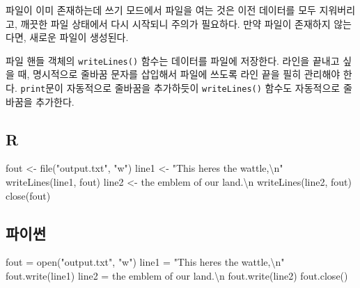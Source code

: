 \documentclass[
  letterpaper,
]{book}
\newenvironment{Shaded}{\begin{snugshade}}{\end{snugshade}}
\newcommand{\BuiltInTok}[1]{\textcolor[rgb]{0.00,0.23,0.31}{#1}}
\newcommand{\CharTok}[1]{\textcolor[rgb]{0.13,0.47,0.30}{#1}}
\newcommand{\FunctionTok}[1]{\textcolor[rgb]{0.28,0.35,0.67}{#1}}
\newcommand{\NormalTok}[1]{\textcolor[rgb]{0.00,0.23,0.31}{#1}}
\newcommand{\OperatorTok}[1]{\textcolor[rgb]{0.37,0.37,0.37}{#1}}
\newcommand{\OtherTok}[1]{\textcolor[rgb]{0.00,0.23,0.31}{#1}}
\newcommand{\SpecialCharTok}[1]{\textcolor[rgb]{0.37,0.37,0.37}{#1}}
\newcommand{\StringTok}[1]{\textcolor[rgb]{0.13,0.47,0.30}{#1}}
\begin{document}
파일이 이미 존재하는데 쓰기 모드에서 파일을 여는 것은 이전 데이터를 모두
지워버리고, 깨끗한 파일 상태에서 다시 시작되니 주의가 필요하다. 만약
파일이 존재하지 않는다면, 새로운 파일이 생성된다.

파일 핸들 객체의 \texttt{writeLines()} 함수는 데이터를 파일에 저장한다.
라인을 끝내고 싶을 때, 명시적으로 줄바꿈 문자를 삽입해서 파일에 쓰도록
라인 끝을 필히 관리해야 한다. \texttt{print}문이 자동적으로 줄바꿈을
추가하듯이 \texttt{writeLines()} 함수도 자동적으로 줄바꿈을 추가한다.

\subsection*{R}\label{r-40}

\begin{Shaded}
\begin{Highlighting}[]
\NormalTok{fout }\OtherTok{\textless{}{-}} \FunctionTok{file}\NormalTok{(}\StringTok{"output.txt"}\NormalTok{, }\StringTok{"w"}\NormalTok{)}
\NormalTok{line1 }\OtherTok{\textless{}{-}} \StringTok{"This here\textquotesingle{}s the wattle,}\SpecialCharTok{\textbackslash{}n}\StringTok{"}
\FunctionTok{writeLines}\NormalTok{(line1, fout)}
\NormalTok{line2 }\OtherTok{\textless{}{-}} \StringTok{\textquotesingle{}the emblem of our land.}\SpecialCharTok{\textbackslash{}n}\StringTok{\textquotesingle{}}
\FunctionTok{writeLines}\NormalTok{(line2, fout)}
\FunctionTok{close}\NormalTok{(fout)}
\end{Highlighting}
\end{Shaded}

\subsection*{파이썬}\label{uxd30cuxc774uxc36c-40}

\begin{Shaded}
\begin{Highlighting}[]
\NormalTok{fout }\OperatorTok{=} \BuiltInTok{open}\NormalTok{(}\StringTok{"output.txt"}\NormalTok{, }\StringTok{"w"}\NormalTok{)}
\NormalTok{line1 }\OperatorTok{=} \StringTok{"This here\textquotesingle{}s the wattle,}\CharTok{\textbackslash{}n}\StringTok{"}
\NormalTok{fout.write(line1)}
\NormalTok{line2 }\OperatorTok{=} \StringTok{\textquotesingle{}the emblem of our land.}\CharTok{\textbackslash{}n}\StringTok{\textquotesingle{}}
\NormalTok{fout.write(line2)}
\NormalTok{fout.close()}
\end{Highlighting}
\end{Shaded}
\end{document}
